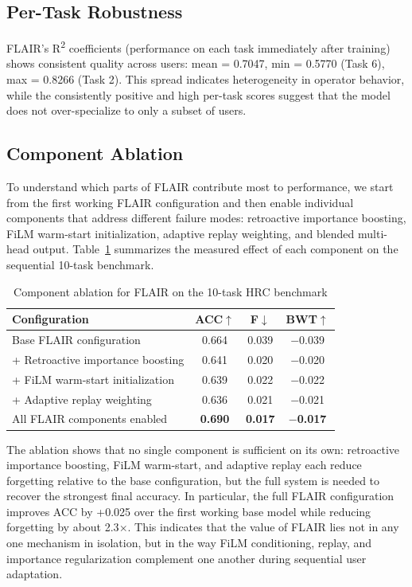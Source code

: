 \documentclass[3p,times,procedia]{elsarticle}
\begin{document}
\subsection{Per-Task Robustness}

FLAIR's R\textsuperscript{2} coefficients (performance on each task immediately after training) shows consistent quality across users: mean = 0.7047, min = 0.5770 (Task 6), max = 0.8266 (Task 2). This spread indicates heterogeneity in operator behavior, while the consistently positive and high per-task scores suggest that the model does not over-specialize to only a subset of users.

\subsection{Component Ablation}

To understand which parts of FLAIR contribute most to performance, we start from the first working FLAIR configuration and then enable individual components that address different failure modes: retroactive importance boosting, FiLM warm-start initialization, adaptive replay weighting, and blended multi-head output. Table~\ref{tab:ablation} summarizes the measured effect of each component on the sequential 10-task benchmark.

\begin{table}[h!]
\caption{Component ablation for FLAIR on the 10-task HRC benchmark}
\label{tab:ablation}
\centering
\footnotesize
\setlength{\tabcolsep}{4pt}
\begin{tabular}{@{}lccc@{}}
\toprule
\textbf{Configuration} & \textbf{ACC}$\uparrow$ & \textbf{F}$\downarrow$ & \textbf{BWT}$\uparrow$ \\
\midrule
Base FLAIR configuration & 0.664 & 0.039 & $-$0.039 \\
+ Retroactive importance boosting & 0.641 & 0.020 & $-$0.020 \\
+ FiLM warm-start initialization & 0.639 & 0.022 & $-$0.022 \\
+ Adaptive replay weighting & 0.636 & 0.021 & $-$0.021 \\
All FLAIR components enabled & \textbf{0.690} & \textbf{0.017} & \textbf{$-$0.017} \\
\bottomrule
\end{tabular}
\end{table}
The ablation shows that no single component is sufficient on its own: retroactive importance boosting, FiLM warm-start, and adaptive replay each reduce forgetting relative to the base configuration, but the full system is needed to recover the strongest final accuracy. In particular, the full FLAIR configuration improves ACC by +0.025 over the first working base model while reducing forgetting by about 2.3$\times$. This indicates that the value of FLAIR lies not in any one mechanism in isolation, but in the way FiLM conditioning, replay, and importance regularization complement one another during sequential user adaptation.
\end{document}
